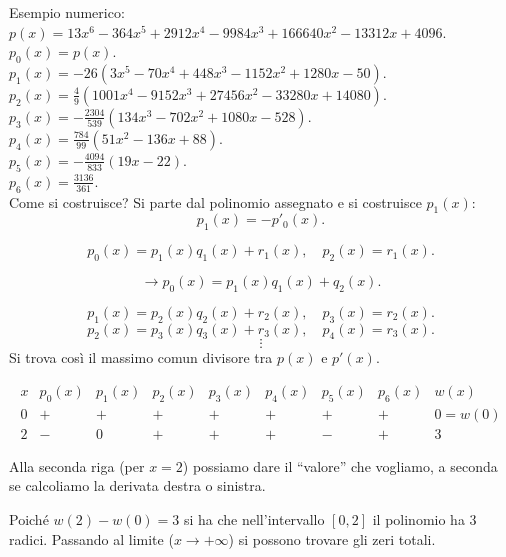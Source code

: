 \begin{exe}Esempio numerico:\\
$p(x) = 13x^6 - 364x^5+2912x^4-9984x^3+166640x^2-13312x+4096$.\\
$p_0(x) = p(x)$.\\
$p_1(x) = -26(3x^5-70x^4+448x^3-1152x^2+ 1280x -50)$.\\
$p_2(x) = \frac{4}{9}(1001x^4-9152x^3+27456x^2-33280x+14080)$.\\
$p_3(x) = -\frac{2304}{539}(134x^3-702x^2+1080x-528)$.\\
$p_4(x) = \frac{784}{99}(51x^2-136x+88)$.\\
$p_5(x) = -\frac{4094}{833}(19x-22)$.\\
$p_6(x) = \frac{3136}{361}$.\\

Come si costruisce? Si parte dal polinomio assegnato e si costruisce $p_1(x)$:
\[
p_1(x) = - p'_0(x).
\]

\[
p_0(x) = p_1(x)q_1(x) +r_1(x), \quad p_2(x) = r_1(x).
\]

\[\longrightarrow
p_0(x) = p_1(x)q_1(x) + q_2(x).
\]

\[
p_1(x) = p_2(x)q_2(x) +r_2(x), \quad p_3(x) = r_2(x).
\]
\[
p_2(x) = p_3(x)q_3(x) +r_3(x), \quad p_4(x) = r_3(x).
\]
\[\vdots\]
Si trova così il massimo comun divisore tra $p(x)$ e $p'(x)$.

\[
\begin{array}{c|cccccccc}
x & p_0(x) & p_1(x) & p_2(x) & p_3(x) & p_4(x) & p_5(x) & p_6(x) & w(x) \\
\hline 
0 & + & + & + & + & + & + & + & 0 = w(0) \\
2 & - & 0 & + & + & + & - & + & 3 
\end{array}
\]

Alla seconda riga (per $x = 2$) possiamo dare il ``valore'' che vogliamo, a 
seconda se calcoliamo la derivata destra o sinistra.

Poiché $w(2)-w(0) = 3$ si ha che nell'intervallo $[0,2]$ il polinomio ha
$3$ radici. Passando al limite ($x \to + \infty$) si possono trovare gli zeri
totali.
\end{exe}
